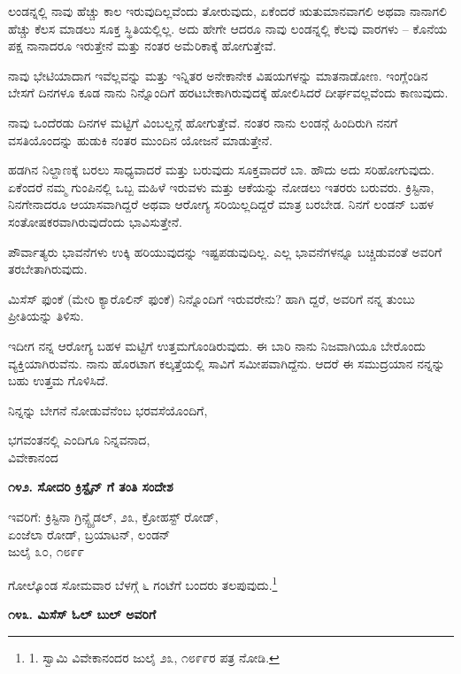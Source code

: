 ಲಂಡನ್ನಲ್ಲಿ ನಾವು ಹೆಚ್ಚು ಕಾಲ ಇರುವುದಿಲ್ಲವೆಂದು ತೋರುವುದು, ಏಕೆಂದರೆ ಋತುಮಾನವಾಗಲಿ ಅಥವಾ ನಾನಾಗಲಿ ಹೆಚ್ಚು ಕೆಲಸ ಮಾಡಲು ಸೂಕ್ತ ಸ್ಥಿತಿಯಲ್ಲಿಲ್ಲ. ಅದು ಹೇಗೇ ಆದರೂ ನಾವು ಲಂಡನ್ನಲ್ಲಿ ಕೆಲವು ವಾರಗಳು – ಕೊನೆಯ ಪಕ್ಷ ನಾನಾದರೂ ಇರುತ್ತೇನೆ ಮತ್ತು ನಂತರ ಅಮೆರಿಕಾಕ್ಕೆ ಹೋಗುತ್ತೇವೆ.

ನಾವು ಭೇಟಿಯಾದಾಗ ಇವೆಲ್ಲವನ್ನು ಮತ್ತು ಇನ್ನಿತರ ಅನೇಕಾನೇಕ ವಿಷಯಗಳನ್ನು ಮಾತನಾಡೋಣ. ಇಂಗ್ಲೆಂಡಿನ ಬೇಸಗೆ ದಿನಗಳೂ ಕೂಡ ನಾನು ನಿನ್ನೊಂದಿಗೆ ಹರಟಬೇಕಾಗಿರುವುದಕ್ಕೆ ಹೋಲಿಸಿದರೆ ದೀರ್ಘವಲ್ಲವೆಂದು ಕಾಣುವುದು.

ನಾವು ಒಂದೆರಡು ದಿನಗಳ ಮಟ್ಟಿಗೆ ವಿಂಬಲ್ಡನ್ಗೆ ಹೋಗುತ್ತೇವೆ. ನಂತರ ನಾನು ಲಂಡನ್ಗೆ ಹಿಂದಿರುಗಿ ನನಗೆ ವಸತಿಯೊಂದನ್ನು ಹುಡುಕಿ ನಂತರ ಮುಂದಿನ ಯೋಜನೆ ಮಾಡುತ್ತೇನೆ.

ಹಡಗಿನ ನಿಲ್ದಾಣಕ್ಕೆ ಬರಲು ಸಾಧ್ಯವಾದರೆ ಮತ್ತು ಬರುವುದು ಸೂಕ್ತವಾದರೆ ಬಾ. ಹೌದು ಅದು ಸರಿಹೋಗುವುದು. ಏಕೆಂದರೆ ನಮ್ಮ ಗುಂಪಿನಲ್ಲಿ ಒಬ್ಬ ಮಹಿಳೆ ಇರುವಳು ಮತ್ತು ಆಕೆಯನ್ನು ನೋಡಲು ಇತರರು ಬರುವರು. ಕ್ರಿಸ್ಟಿನಾ, ನಿನಗೇನಾದರೂ ಆಯಾಸವಾಗಿದ್ದರೆ ಅಥವಾ ಆರೋಗ್ಯ ಸರಿಯಿಲ್ಲದಿದ್ದರೆ ಮಾತ್ರ ಬರಬೇಡ. ನಿನಗೆ ಲಂಡನ್ ಬಹಳ ಸಂತೋಷಕರವಾಗಿರುವುದೆಂದು ಭಾವಿಸುತ್ತೇನೆ.

ಪೌರ್ವಾತ್ಯರು ಭಾವನೆಗಳು ಉಕ್ಕಿ ಹರಿಯುವುದನ್ನು ಇಷ್ಟಪಡುವುದಿಲ್ಲ. ಎಲ್ಲ ಭಾವನೆಗಳನ್ನೂ ಬಚ್ಚಿಡುವಂತೆ ಅವರಿಗೆ ತರಬೇತಾಗಿರುವುದು.

ಮಿಸೆಸ್ ಫುಂಕೆ (ಮೇರಿ ಕ್ಯಾರೊಲಿನ್ ಫುಂಕೆ) ನಿನ್ನೊಂದಿಗೆ ಇರುವರೇನು? ಹಾಗಿ ದ್ದರೆ, ಅವರಿಗೆ ನನ್ನ ತುಂಬು ಪ್ರೀತಿಯನ್ನು ತಿಳಿಸು.

ಇದೀಗ ನನ್ನ ಆರೋಗ್ಯ ಬಹಳ ಮಟ್ಟಿಗೆ ಉತ್ತಮಗೊಂಡಿರುವುದು. ಈ ಬಾರಿ ನಾನು ನಿಜವಾಗಿಯೂ ಬೇರೊಂದು ವ್ಯಕ್ತಿಯಾಗಿರುವೆನು. ನಾನು ಹೊರಟಾಗ ಕಲ್ಕತ್ತೆಯಲ್ಲಿ ಸಾವಿಗೆ ಸಮೀಪವಾಗಿದ್ದೆನು. ಆದರೆ ಈ ಸಮುದ್ರಯಾನ ನನ್ನನ್ನು ಬಹು ಉತ್ತಮ ಗೊಳಿಸಿದೆ.

ನಿನ್ನನ್ನು ಬೇಗನೆ ನೋಡುವೆನೆಂಬ ಭರವಸೆಯೊಂದಿಗೆ,

\begin{flushright}
ಭಗವಂತನಲ್ಲಿ ಎಂದಿಗೂ ನಿನ್ನವನಾದ,\\ವಿವೇಕಾನಂದ
\end{flushright}

\begin{center}
\textbf{೧೪೨. ಸೋದರಿ ಕ್ರಿಸ್ಟೈನ್ ಗೆ ತಂತಿ ಸಂದೇಶ}
\end{center}

\begin{flushright}
ಇವರಿಗೆ: ಕ್ರಿಸ್ಟಿನಾ ಗ್ರಿನ್ಸ್ಟೈಡಲ್, ೨೩, ಕ್ರೋಹಸ್ಟ್ ರೋಡ್,\\ಏಂಜೆಲಾ ರೋಡ್, ಬ್ರಯಾಟನ್, ಲಂಡನ್\\ಜುಲೈ ೩೦, ೧೮೯೯
\end{flushright}

ಗೋಲ್ಕೊಂಡ ಸೋಮವಾರ ಬೆಳಗ್ಗೆ ೬ ಗಂಟೆಗೆ ಬಂದರು ತಲಪುವುದು.\footnote{1. ಸ್ವಾಮಿ ವಿವೇಕಾನಂದರ ಜುಲೈ ೨೩, ೧೮೯೯ರ ಪತ್ರ ನೋಡಿ.}

\begin{center}
\textbf{೧೪೩. ಮಿಸೆಸ್ ಓಲ್ ಬುಲ್ ಅವರಿಗೆ}
\end{center}

